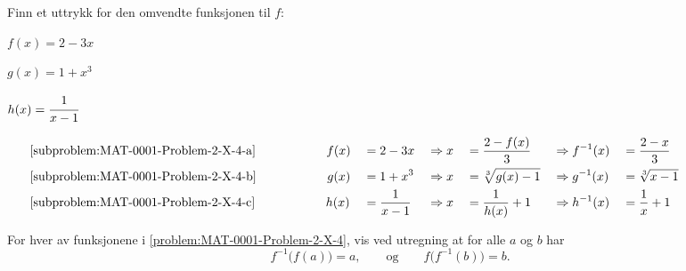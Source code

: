 \documentclass[a4paper,11pt]{article}
\begin{document}

\begin{problem}[4]
    \label{problem:MAT-0001-Problem-2-X-4}
    Finn et uttrykk for den omvendte funksjonen til $f$:
\end{problem}

\begin{subproblem}{3}
    \item $f(x) = 2 - 3x$
    \label{subproblem:MAT-0001-Problem-2-X-4-a}
    \item $g(x) = 1 + x^3$
    \label{subproblem:MAT-0001-Problem-2-X-4-b}
    \item \vspace*{-0.8cm}$h(x) = \cfrac{1}{x - 1}$
    \label{subproblem:MAT-0001-Problem-2-X-4-c}
\end{subproblem}

\begin{solution}
    \def\flushspace{\hspace{2cm}}
    \begin{alignat*}{6}
           &\ref{subproblem:MAT-0001-Problem-2-X-4-a} \flushspace
           f(x) &&= 2 - 3x 
           &&\Rightarrow x 
           &&= \frac{2 - f(x)}{3} 
           &&\Rightarrow f^{-1}(x) 
           &&= \frac{2 - x}{3} \flushspace \\
         &\ref{subproblem:MAT-0001-Problem-2-X-4-b} \flushspace 
           g(x) &&= 1 + x^3 
           &&\Rightarrow x 
           &&= \sqrt[3]{g(x) - 1} 
           &&\Rightarrow g^{-1}(x) 
           &&= \sqrt[3]{x - 1} \flushspace \\
         &\ref{subproblem:MAT-0001-Problem-2-X-4-c} \flushspace
           h(x) &&= \frac{1}{x - 1} 
           &&\Rightarrow x 
           &&= \frac{1}{h(x)} + 1  
           &&\Rightarrow h^{-1}(x) 
           &&= \frac{1}{x} + 1 \flushspace 
    \end{alignat*}
\end{solution}


\begin{problem}[5]
    For hver av funksjonene i \cref{problem:MAT-0001-Problem-2-X-4}, vis ved 
    utregning at for alle $a$ og $b$ har
    \begin{equation*}
        f^{-1}\bigl(f(a)\bigr) = a,
        \qquad \text{og} \qquad 
        f\bigl(f^{-1}(b)\bigr) = b.
    \end{equation*}
\end{problem}
\end{document}
